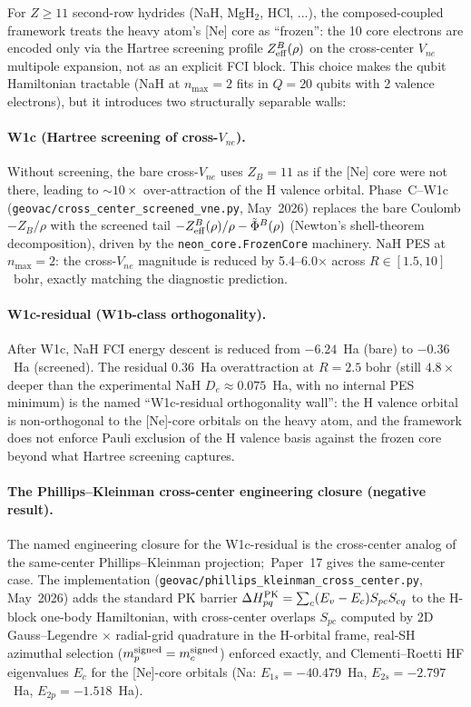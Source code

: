 \documentclass[aps,pra,twocolumn,superscriptaddress,longbibliography]{revtex4-2}
\begin{document}
For $Z \geq 11$ second-row hydrides (NaH, MgH$_2$, HCl, ...), the
composed-coupled framework treats the heavy atom's [Ne] core as
``frozen'': the 10 core electrons are encoded only via the Hartree
screening profile $Z_{\rm eff}^B(\rho)$ on the cross-center
$V_{ne}$ multipole expansion, not as an explicit FCI block. This
choice makes the qubit Hamiltonian tractable (NaH at $n_{\max} = 2$
fits in $Q = 20$ qubits with 2 valence electrons), but it
introduces two structurally separable walls:

\paragraph{W1c (Hartree screening of cross-$V_{ne}$).}
Without screening, the bare cross-$V_{ne}$ uses $Z_B = 11$ as if the
[Ne] core were not there, leading to ${\sim}10\times$ over-attraction
of the H valence orbital. Phase~C--W1c
(\texttt{geovac/cross\_center\_screened\_vne.py}, May~2026) replaces
the bare Coulomb $-Z_B/\rho$ with the screened tail
$-Z_{\rm eff}^B(\rho)/\rho - \tilde\Phi^B(\rho)$ (Newton's
shell-theorem decomposition), driven by the
\texttt{neon\_core.FrozenCore} machinery. NaH PES at $n_{\max} = 2$:
the cross-$V_{ne}$ magnitude is reduced by 5.4--6.0$\times$ across
$R \in [1.5, 10]$~bohr, exactly matching the diagnostic prediction.

\paragraph{W1c-residual (W1b-class orthogonality).}
After W1c, NaH FCI energy descent is reduced from
$-6.24$~Ha (bare) to $-0.36$~Ha (screened). The residual
$0.36$~Ha overattraction at $R = 2.5$ bohr (still $4.8\times$
deeper than the experimental NaH $D_e \approx 0.075$~Ha, with no
internal PES minimum) is the named ``W1c-residual orthogonality
wall'': the H valence orbital is non-orthogonal to the [Ne]-core
orbitals on the heavy atom, and the framework does not enforce
Pauli exclusion of the H valence basis against the frozen core
beyond what Hartree screening captures.

\paragraph{The Phillips--Kleinman cross-center engineering closure
(negative result).}
The named engineering closure for the W1c-residual is the
cross-center analog of the same-center Phillips--Kleinman
projection;\ Paper~17 gives the same-center case. The implementation
(\texttt{geovac/phillips\_kleinman\_cross\_center.py}, May~2026)
adds the standard PK barrier
$\Delta H_{pq}^{\rm PK} = \sum_c (E_v - E_c) S_{pc} S_{cq}$ to the
H-block one-body Hamiltonian, with cross-center overlaps $S_{pc}$
computed by 2D Gauss--Legendre $\times$ radial-grid quadrature
in the H-orbital frame, real-SH azimuthal selection
($m_p^{\rm signed} = m_c^{\rm signed}$) enforced exactly,
and Clementi--Roetti HF eigenvalues $E_c$ for the [Ne]-core
orbitals (Na: $E_{1s} = -40.479$~Ha, $E_{2s} = -2.797$~Ha,
$E_{2p} = -1.518$~Ha).
\end{document}
